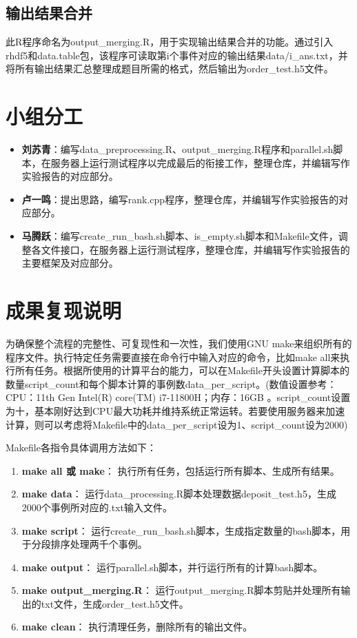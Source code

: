 \documentclass[12pt,a4paper]{article}%
\begin{document}
    \subsection{输出结果合并}
    此R程序命名为output\_merging.R，用于实现输出结果合并的功能。通过引入rhdf5和data.table包，该程序可读取第i个事件对应的输出结果data/i\_ans.txt，并将所有输出结果汇总整理成题目所需的格式，然后输出为order\_test.h5文件。
    
\section{小组分工}
    \begin{itemize}
        \item \textbf{刘苏青}：编写data\_preprocessing.R、output\_merging.R程序和parallel.sh脚本，在服务器上运行测试程序以完成最后的衔接工作，整理仓库，并编辑写作实验报告的对应部分。
        \item \textbf{卢一鸣}：提出思路，编写rank.cpp程序，整理仓库，并编辑写作实验报告的对应部分。
        \item \textbf{马腾跃}：编写create\_run\_bash.sh脚本、is\_empty.sh脚本和Makefile文件，调整各文件接口，在服务器上运行测试程序，整理仓库，并编辑写作实验报告的主要框架及对应部分。
    \end{itemize}
\newpage
\section{成果复现说明}
为确保整个流程的完整性、可复现性和一次性，我们使用GNU make来组织所有的程序文件。执行特定任务需要直接在命令行中输入对应的命令，比如make all来执行所有任务。根据所使用的计算平台的能力，可以在Makefile开头设置计算脚本的数量script\_count和每个脚本计算的事例数data\_per\_script。(数值设置参考：CPU：11th Gen Intel(R) core(TM) i7-11800H；内存：16GB 。script\_count设置为十，基本刚好达到CPU最大功耗并维持系统正常运转。若要使用服务器来加速计算，则可以考虑将Makefile中的data\_per\_script设为1、script\_count设为2000)\par
Makefile各指令具体调用方法如下：
\begin{tcolorbox}[width=16cm, breakable]
    \begin{enumerate}
        \item \textbf{make all 或 make}：
        执行所有任务，包括运行所有脚本、生成所有结果。
        \item \textbf{make data}：
        运行data\_processing.R脚本处理数据deposit\_test.h5，生成2000个事例所对应的.txt输入文件。
        \item \textbf{make script}：
        运行create\_run\_bash.sh脚本，生成指定数量的bash脚本，用于分段排序处理两千个事例。
        \item \textbf{make output}：
        运行parallel.sh脚本，并行运行所有的计算bash脚本。
        \item \textbf{make output\_merging.R}：
        运行output\_merging.R脚本剪贴并处理所有输出的txt文件，生成order\_test.h5文件。
        \item \textbf{make clean}：
        执行清理任务，删除所有的输出文件。
    \end{enumerate}   
\end{tcolorbox}
\end{document}

